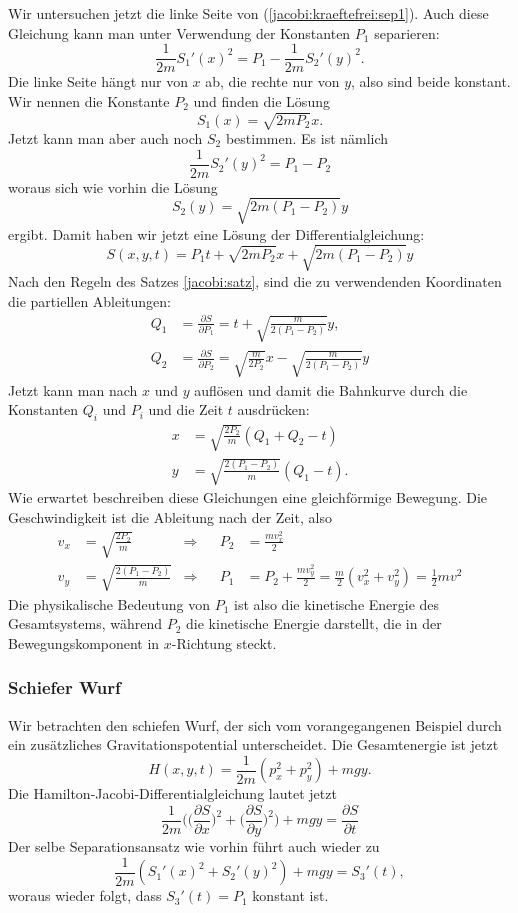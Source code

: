 Wir untersuchen jetzt die linke Seite von (\ref{jacobi:kraeftefrei:sep1}).
Auch diese Gleichung kann man unter Verwendung der Konstanten $P_1$
separieren:
\[
\frac1{2m} S_1'(x)^2
=
P_1-\frac1{2m}S_2'(y)^2.
\]
Die linke Seite hängt nur von $x$ ab, die rechte nur von $y$, also
sind beide konstant. 
Wir nennen die Konstante $P_2$ und finden die Lösung
\[
S_1(x)
=
\sqrt{2mP_2}x.
\]
Jetzt kann man aber auch noch $S_2$ bestimmen. Es ist nämlich 
\[
\frac1{2m} S_2'(y)^2
=P_1-P_2
\]
woraus sich wie vorhin die Lösung
\[
S_2(y)
=
\sqrt{2m(P_1-P_2)}y
\]
ergibt. Damit haben wir jetzt eine Lösung der Differentialgleichung:
\[
S(x,y,t)=
P_1t
+
\sqrt{2mP_2}x
+
\sqrt{2m(P_1-P_2)}y
\]
Nach den Regeln des Satzes \ref{jacobi:satz}, sind die zu verwendenden
Koordinaten die partiellen Ableitungen:
\begin{align*}
Q_1&=\frac{\partial S}{\partial P_1}
=
t + \sqrt{\frac{m}{2(P_1-P_2)}}y,\\
Q_2&=\frac{\partial S}{\partial P_2}
=
\sqrt{\frac{m}{2P_2}}x
-
\sqrt{\frac{m}{2(P_1-P_2)}}y
\end{align*}
Jetzt kann man nach $x$ und $y$ auflösen und damit die
Bahnkurve durch die Konstanten $Q_i$ und $P_i$ und die Zeit $t$
ausdrücken:
\begin{align*}
x&=\sqrt{\frac{2P_2}{m}}(Q_1+Q_2-t)\\
y&=\sqrt{\frac{2(P_1-P_2)}{m}}(Q_1-t).
\end{align*}
Wie erwartet beschreiben diese Gleichungen eine gleichförmige
Bewegung. Die Geschwindigkeit ist die Ableitung nach der Zeit,
also
\begin{align*}
v_x
&=
\sqrt{\frac{2P_2}{m}}
&\Rightarrow&&
P_2&=\frac{mv_x^2}2
\\
v_y
&=
\sqrt{\frac{2(P_1-P_2)}{m}}
&\Rightarrow&&
P_1&=P_2+\frac{mv_y^2}2=\frac{m}2(v_x^2+v_y^2)=\frac12mv^2
\end{align*}
Die physikalische Bedeutung von $P_1$ ist also die kinetische
Energie des
Gesamtsystems, während $P_2$ die kinetische Energie darstellt, die in
der Bewegungskomponent in $x$-Richtung steckt.

\subsubsection{Schiefer Wurf}
Wir betrachten den schiefen Wurf, der sich vom vorangegangenen
Beispiel durch ein zusätzliches Gravitationspotential
unterscheidet. Die Gesamtenergie ist jetzt
\[
H(x,y,t)=\frac1{2m}(p_x^2+p_y^2)+mgy.
\]
Die Hamilton-Jacobi-Differentialgleichung lautet jetzt
\[
\frac1{2m}\biggl(
\biggl(\frac{\partial S}{\partial x}\biggr)^2
+
\biggl(\frac{\partial S}{\partial y}\biggr)^2
\biggr)
+mgy=\frac{\partial S}{\partial t} 
\]
Der selbe Separationsansatz wie vorhin führt auch wieder zu
\[
\frac1{2m}(S_1'(x)^2+S_2'(y)^2)+mgy=S_3'(t),
\]
woraus wieder folgt, dass $S_3'(t)=P_1$ konstant ist.

